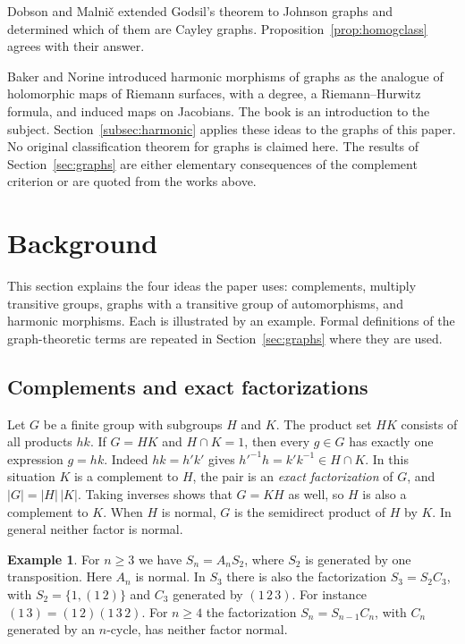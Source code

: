 \documentclass[12pt,letterpaper]{article}
\numberwithin{equation}{section}
\theoremstyle{definition}
\newtheorem{example}[theorem]{Example}
\begin{document}
Dobson and Malni\v{c} \cite{DM15} extended Godsil's theorem to Johnson graphs and determined which of them are Cayley graphs. Proposition~\ref{prop:homogclass} agrees with their answer.

Baker and Norine \cite{BN09} introduced harmonic morphisms of graphs as the analogue of holomorphic maps of Riemann surfaces, with a degree, a Riemann--Hurwitz formula, and induced maps on Jacobians. The book \cite{MJ26} is an introduction to the subject. Section~\ref{subsec:harmonic} applies these ideas to the graphs of this paper. No original classification theorem for graphs is claimed here. The results of Section~\ref{sec:graphs} are either elementary consequences of the complement criterion or are quoted from the works above.

\section{Background}\label{sec:background}
This section explains the four ideas the paper uses: complements, multiply transitive groups, graphs with a transitive group of automorphisms, and harmonic morphisms. Each is illustrated by an example. Formal definitions of the graph-theoretic terms are repeated in Section~\ref{sec:graphs} where they are used.

\subsection*{Complements and exact factorizations}
Let $G$ be a finite group with subgroups $H$ and $K$. The product set $HK$ consists of all products $hk$. If $G=HK$ and $H\cap K=1$, then every $g\in G$ has exactly one expression $g=hk$. Indeed $hk=h'k'$ gives $h'^{-1}h=k'k^{-1}\in H\cap K$. In this situation $K$ is a complement to $H$, the pair is an \emph{exact factorization} of $G$, and $|G|=|H|\,|K|$. Taking inverses shows that $G=KH$ as well, so $H$ is also a complement to $K$. When $H$ is normal, $G$ is the semidirect product of $H$ by $K$. In general neither factor is normal.
\begin{example}\label{ex:s3}
For $n\geq3$ we have $S_n=A_nS_2$, where $S_2$ is generated by one transposition. Here $A_n$ is normal. In $S_3$ there is also the factorization $S_3=S_2C_3$, with $S_2=\{1,(1\,2)\}$ and $C_3$ generated by $(1\,2\,3)$. For instance $(1\,3)=(1\,2)(1\,3\,2)$. For $n\geq4$ the factorization $S_n=S_{n-1}C_n$, with $C_n$ generated by an $n$-cycle, has neither factor normal.
\end{example}
\end{document}
